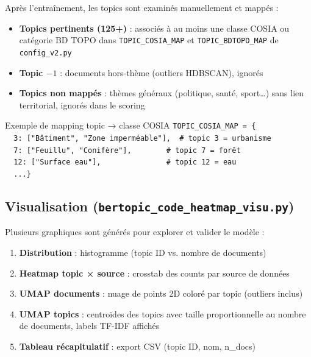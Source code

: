 \documentclass[12pt,a4paper]{report}
\newcommand{\code}[1]{\texttt{\small #1}}
\newcommand{\bdtopo}{\textsc{BD TOPO}}
\begin{document}
Après l'entraînement, les topics sont examinés manuellement et mappés :

\begin{itemize}
  \item \textbf{Topics pertinents (125+)} : associés à au moins une classe COSIA ou catégorie \bdtopo{} dans \code{TOPIC\_COSIA\_MAP} et \code{TOPIC\_BDTOPO\_MAP} de \code{config\_v2.py}
  \item \textbf{Topic $-1$} : documents hors-thème (outliers HDBSCAN), ignorés
  \item \textbf{Topics non mappés} : thèmes généraux (politique, santé, sport…) sans lien territorial, ignorés dans le scoring
\end{itemize}

\begin{infobox}{Exemple de mapping topic → classe COSIA}
\small
\code{TOPIC\_COSIA\_MAP = \{}\\
\code{\ \ 3: ["Bâtiment", "Zone imperméable"],\ \ \# topic 3 = urbanisme}\\
\code{\ \ 7: ["Feuillu", "Conifère"],\ \ \ \ \ \ \ \ \# topic 7 = forêt}\\
\code{\ \ 12: ["Surface eau"],\ \ \ \ \ \ \ \ \ \ \ \ \ \ \ \# topic 12 = eau}\\
\code{\ \ ...\}}
\end{infobox}

\subsection{Visualisation (\code{bertopic\_code\_heatmap\_visu.py})}

Plusieurs graphiques sont générés pour explorer et valider le modèle :

\begin{enumerate}
  \item \textbf{Distribution} : histogramme (topic ID vs. nombre de documents)
  \item \textbf{Heatmap topic × source} : crosstab des counts par source de données
  \item \textbf{UMAP documents} : nuage de points 2D coloré par topic (outliers inclus)
  \item \textbf{UMAP topics} : centroïdes des topics avec taille proportionnelle au nombre de documents, labels TF-IDF affichés
  \item \textbf{Tableau récapitulatif} : export CSV (topic ID, nom, n\_docs)
\end{enumerate}
\end{document}
